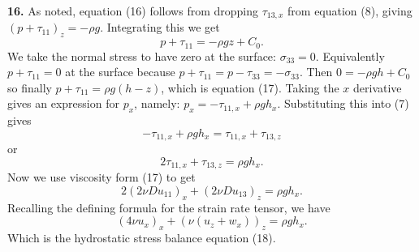 \documentclass[10pt]{amsart}
\newcommand{\prob}[1]{\bigskip\noindent\large\textbf{#1.}\normalsize }
\begin{document}
\prob{16}  As noted, equation (16) follows from dropping $\tau_{13,x}$ from equation (8), giving $(p+\tau_{11})_z = -\rho g$.  Integrating this we get
    $$p+\tau_{11} = -\rho g z + C_0.$$
We take the normal stress to have zero at the surface: $\sigma_{33} = 0$.  Equivalently $p+\tau_{11}=0$ at the surface because $p+\tau_{11} = p-\tau_{33} = -\sigma_{33}$.  Then $0=-\rho g h + C_0$ so finally $p + \tau_{11} = \rho g (h-z)$, which is equation (17).  Taking the $x$ derivative gives an expression for $p_x$, namely: $p_x = -\tau_{11,x} + \rho g h_x$.  Substituting this into (7) gives
    $$-\tau_{11,x} + \rho g h_x = \tau_{11,x} + \tau_{13,z}$$
or
    $$2 \tau_{11,x} + \tau_{13,z} = \rho g h_x.$$
Now we use viscosity form (17) to get
    $$2 \left(2 \nu Du_{11}\right)_x + \left(2 \nu Du_{13}\right)_z = \rho g h_x.$$
Recalling the defining formula for the strain rate tensor, we have
    $$\left(4 \nu u_x\right)_x + \left(\nu (u_z + w_x)\right)_z = \rho g h_x.$$
Which is the hydrostatic stress balance equation (18).
\end{document}
